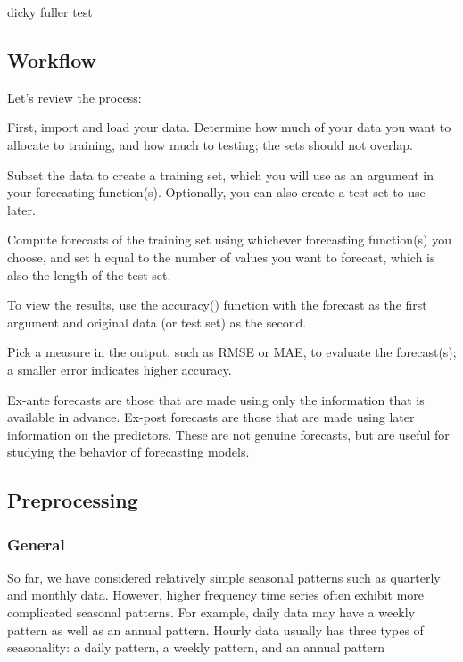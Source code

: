 \documentclass[]{book}
\begin{document}
dicky fuller test

\hypertarget{workflow-1}{%
\subsection{Workflow}\label{workflow-1}}

Let's review the process:

First, import and load your data. Determine how much of your data you want to allocate to training, and how much to testing; the sets should not overlap.

Subset the data to create a training set, which you will use as an argument in your forecasting function(s). Optionally, you can also create a test set to use later.

Compute forecasts of the training set using whichever forecasting function(s) you choose, and set h equal to the number of values you want to forecast, which is also the length of the test set.

To view the results, use the accuracy() function with the forecast as the first argument and original data (or test set) as the second.

Pick a measure in the output, such as RMSE or MAE, to evaluate the forecast(s); a smaller error indicates higher accuracy.

Ex-ante forecasts are those that are made using only the information that is available in advance. Ex-post forecasts are those that are made using later information on the predictors. These are not genuine forecasts, but are useful for studying the behavior of forecasting models.

\hypertarget{preprocessing}{%
\subsection{Preprocessing}\label{preprocessing}}

\hypertarget{general-6}{%
\subsubsection{General}\label{general-6}}

So far, we have considered relatively simple seasonal patterns such as quarterly and monthly data. However, higher frequency time series often exhibit more complicated seasonal patterns. For example, daily data may have a weekly pattern as well as an annual pattern. Hourly data usually has three types of seasonality: a daily pattern, a weekly pattern, and an annual pattern
\end{document}
